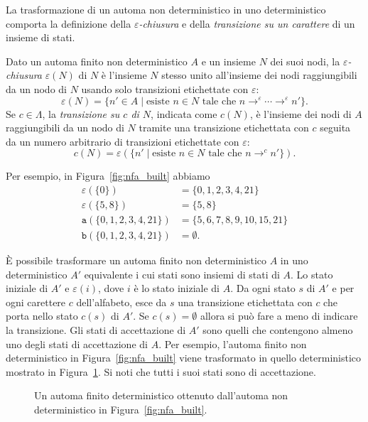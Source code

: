 La trasformazione di un automa non deterministico in uno deterministico
comporta la definizione della \emph{$\varepsilon$-chiusura}
e della \emph{transizione su un carattere} di un insieme di stati.
%
\begin{definition}
  \label{def:closure}
Dato un automa finito non deterministico $A$ e un insieme $N$ dei suoi nodi,
la \emph{$\varepsilon$-chiusura} $\varepsilon(N)$ di $N$ \`e l'insieme $N$
stesso unito all'insieme dei nodi raggiungibili da un nodo di
$N$ usando solo transizioni etichettate con $\varepsilon$:
\[
  \varepsilon(N)=\{n'\in A\mid\text{esiste $n\in N$ tale che
                   $n\to^\varepsilon\cdots\to^\varepsilon n'$}\}.
\]
Se $c\in\Lambda$, la \emph{transizione su $c$ di $N$}, indicata come
$c(N)$, \`e l'insieme dei
nodi di $A$ raggiungibili da un nodo di $N$ tramite una transizione
etichettata con $c$ seguita da un numero arbitrario di transizioni
etichettate con $\varepsilon$:
\[
  c(N)=\varepsilon(\{n'\mid\text{esiste }n\in N\text{ tale che }
                   n\to^c n'\}).
\]
\end{definition}
%
\noindent
Per esempio, in Figura~\ref{fig:nfa_built} abbiamo
\begin{align*}
  \varepsilon(\{0\})&=\{0,1,2,3,4,21\}\\
  \varepsilon(\{5,8\})&=\{5,8\}\\
  \texttt{a}(\{0,1,2,3,4,21\})&=\{5,6,7,8,9,10,15,21\}\\
  \texttt{b}(\{0,1,2,3,4,21\})&=\emptyset.
\end{align*}

\`E possibile trasformare un automa finito non deterministico $A$ in uno
deterministico $A'$ equivalente i cui stati sono insiemi di stati di $A$.
Lo stato iniziale di $A'$ e $\varepsilon(i)$, dove $i$ \`e lo stato iniziale
di $A$. Da ogni stato $s$ di $A'$ e per ogni carettere $c$ dell'alfabeto,
esce da $s$ una transizione etichettata con $c$ che porta nello
stato $c(s)$ di $A'$. Se $c(s)=\emptyset$ allora si pu\`o fare a meno di
indicare la transizione. Gli stati di accettazione di $A'$ sono quelli che
contengono almeno uno degli stati di accettazione di $A$.
Per esempio, l'automa finito non deterministico in Figura~\ref{fig:nfa_built}
viene trasformato in quello deterministico mostrato in
Figura~\ref{fig:dfa_built}. Si noti che tutti i suoi stati sono di
accettazione.
%
\begin{figure}[t]
\begin{center}
\end{center}
\caption{Un automa finito deterministico ottenuto dall'automa non deterministico in Figura~\ref{fig:nfa_built}.}\label{fig:dfa_built}
\end{figure}

